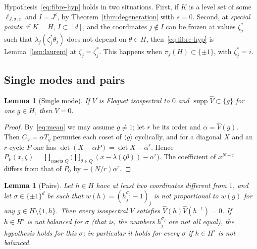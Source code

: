 \documentclass[11pt,reqno]{amsart}
\newtheorem{lemma}[theorem]{Lemma}
\theoremstyle{definition}
\theoremstyle{remark}
\DeclareMathOperator{\supp}{supp}
\begin{document}
Hypothesis~\eqref{eq:fibre-hyp} holds in two situations.  First, if $K$ is a
level set of some $\ell_{J,\sigma,c}$ and $I=J^c$, by
Theorem~\ref{thm:degeneration} with $s=0$.  Second, at \emph{special points}:
if $K=H$, $I\subset[d]$, and the coordinates $j\notin I$ can be frozen at values
$\zeta_j^*$ such that $\lambda_j(\zeta_j^*\theta_j)$ does not depend on
$\theta\in H$, then~\eqref{eq:fibre-hyp} is Lemma~\ref{lem:laurent} at
$\zeta_j=\zeta_j^*$.  This happens when $\pi_j(H)\subset\{\pm1\}$, with
$\zeta_j^*=i$.

\subsection{Single modes and pairs}

\begin{lemma}[Single mode]\label{lem:singlemode}
If $V$ is Floquet isospectral to $0$ and $\supp\widehat V\subset\{g\}$ for one
$g\in H$, then $V=0$.
\end{lemma}

\begin{proof}
By~\eqref{eq:mean} we may assume $g\ne1$; let $r$ be its order and
$\alpha=\widehat V(g)$.  Then $C_V=\alpha T_g$ permutes each coset of $\langle g\rangle$
cyclically, and for a diagonal $X$ and an $r$-cycle $P$ one has
$\det(X-\alpha P)=\det X-\alpha^r$.  Hence
$P_V(x,\zeta)=\prod_{\text{cosets }Q}\bigl(\prod_{\theta\in Q}(x-\lambda(\zeta\theta))-\alpha^r\bigr)$.
The coefficient of $x^{N-r}$ differs from that of $P_0$ by $-(N/r)\alpha^r$.
\end{proof}

\begin{lemma}[Pairs]\label{lem:pair}
Let $h\in H$ have at least two coordinates different from $1$, and let
$\sigma\in\{\pm1\}^d$ be such that $w(h)=(h_j^{\sigma_j}-1)_j$ is not
proportional to $w(g)$ for any $g\in H\setminus\{1,h\}$.  Then every isospectral
$V$ satisfies $\widehat V(h)\widehat V(h^{-1})=0$.  If $h\in H^\circ$ is not
balanced for $\sigma$ (that is, the numbers $h_j^{\sigma_j}$ are not all equal),
the hypothesis holds for this $\sigma$; in particular it holds for every $\sigma$
if $h\in H^\circ$ is not balanced.
\end{lemma}
\end{document}
